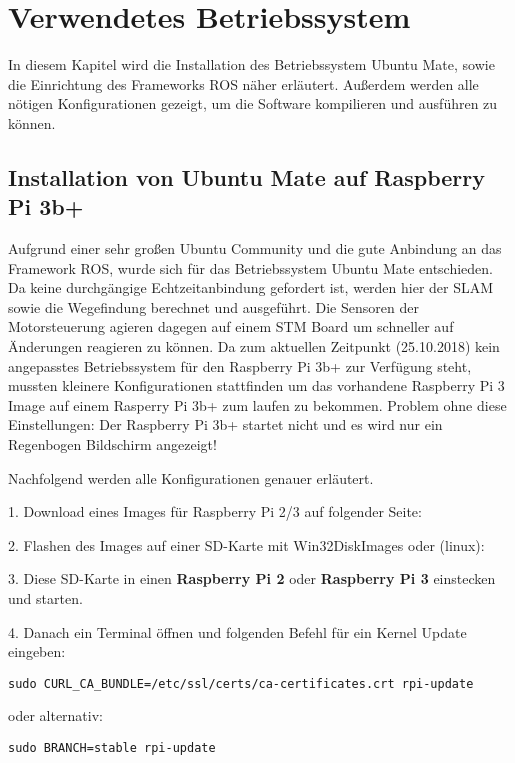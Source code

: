 \chapter{Verwendetes Betriebssystem}
In diesem Kapitel wird die Installation des Betriebssystem Ubuntu Mate, sowie die Einrichtung des Frameworks ROS näher erläutert. Außerdem werden alle nötigen Konfigurationen gezeigt, um die Software kompilieren und ausführen zu können. 


\section{Installation von Ubuntu Mate auf Raspberry Pi 3b+}
Aufgrund einer sehr großen Ubuntu Community und die gute Anbindung an das Framework ROS, wurde sich für das Betriebssystem Ubuntu Mate entschieden. Da keine durchgängige Echtzeitanbindung gefordert ist, werden hier der SLAM sowie die Wegefindung berechnet und ausgeführt. Die Sensoren der Motorsteuerung agieren dagegen auf einem STM Board um schneller auf Änderungen reagieren zu können. 
Da zum aktuellen Zeitpunkt (25.10.2018) kein angepasstes Betriebssystem für den Raspberry Pi 3b+ zur Verfügung steht, mussten kleinere Konfigurationen stattfinden um das vorhandene Raspberry Pi 3 Image auf einem Rasperry Pi 3b+ zum laufen zu bekommen. 
Problem ohne diese Einstellungen: Der Raspberry Pi 3b+ startet nicht und es wird nur ein Regenbogen Bildschirm angezeigt!

Nachfolgend werden alle Konfigurationen genauer erläutert. 

1. Download eines Images für Raspberry  Pi 2/3 auf folgender Seite:

2. Flashen des Images auf einer SD-Karte mit Win32DiskImages oder (linux):

3. Diese SD-Karte in einen \textbf{Raspberry Pi 2} oder \textbf{Raspberry Pi 3} einstecken und starten. 

4. Danach ein Terminal öffnen und folgenden Befehl für ein Kernel Update eingeben:

\begin{lstlisting}
sudo CURL_CA_BUNDLE=/etc/ssl/certs/ca-certificates.crt rpi-update

\end{lstlisting}

oder alternativ: 


\begin{lstlisting}
sudo BRANCH=stable rpi-update

\end{lstlisting}

